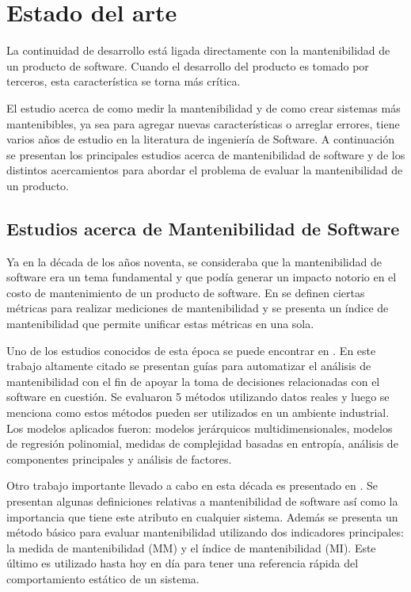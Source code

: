 \chapter{Estado del arte}

La continuidad de desarrollo está ligada directamente con la mantenibilidad
de un producto de software. Cuando el desarrollo del producto es tomado
por terceros, esta característica se torna más crítica.

El estudio acerca de como medir la mantenibilidad y de como crear sistemas
más mantenibibles, ya sea para agregar nuevas características o arreglar
errores, tiene varios años de estudio en la literatura de ingeniería de Software.
A continuación se presentan los principales estudios acerca de mantenibilidad
de software y de los distintos acercamientos para abordar el problema
de evaluar la mantenibilidad de un producto.

\section{Estudios acerca de Mantenibilidad de Software}

Ya en la década de los años noventa, se consideraba que la mantenibilidad
de software era un tema fundamental y que podía generar un impacto notorio
en el costo de mantenimiento de un producto de software. En \cite{Oman:1992}
se definen ciertas métricas para realizar mediciones de mantenibilidad y se
presenta un índice de mantenibilidad que permite unificar estas métricas en
una sola.

Uno de los estudios conocidos de esta época se puede encontrar en \cite{Coleman:1996}.
En este trabajo altamente citado se presentan guías  para automatizar el análisis de
mantenibilidad con el fin de apoyar la toma de decisiones relacionadas con el
software en cuestión. Se evaluaron 5 métodos utilizando datos reales y luego
se menciona como estos métodos pueden ser utilizados en un ambiente industrial.
Los modelos aplicados fueron: modelos jerárquicos multidimensionales, modelos
de regresión polinomial, medidas de complejidad basadas en entropía, análisis
de componentes principales y análisis de factores.

Otro trabajo importante llevado a cabo en esta década es
presentado en \cite{West:1996}. Se presentan algunas definiciones
relativas a mantenibilidad de software así como la importancia que tiene
este atributo en cualquier sistema. Además se presenta un método básico
para evaluar mantenibilidad utilizando dos indicadores principales: la
medida de mantenibilidad (MM) y el índice de mantenibilidad (MI). Este último
es utilizado hasta hoy en día para tener una referencia rápida del comportamiento
estático de un sistema. 

